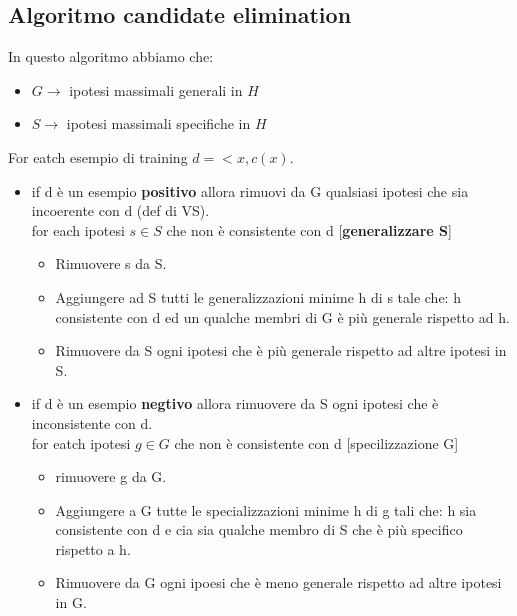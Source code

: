 \subsection{Algoritmo candidate elimination}
In questo algoritmo abbiamo che:
\begin{itemize}
    \item $G \to$ ipotesi massimali generali in $H$
    \item $S \to$ ipotesi massimali specifiche in $H$
\end{itemize}
For eatch esempio di training $d = <x, c(x)$.
\begin{itemize}
    \item if d è un esempio \textbf{positivo} allora rimuovi da G qualsiasi ipotesi che sia incoerente con d (def di VS).\\
    for each ipotesi $s \in S$ che non è consistente con d [\textbf{generalizzare S}]
    \begin{itemize}
        \item Rimuovere s da S.
        \item Aggiungere ad S tutti le generalizzazioni minime h di s tale che: h consistente con d ed un qualche membri di G è più generale rispetto ad h.
        \item Rimuovere da S ogni ipotesi che è più generale rispetto ad altre ipotesi in S.
    \end{itemize}
    \item if d è un esempio \textbf{negtivo} allora rimuovere da S ogni ipotesi che è inconsistente con d.\\
    for eatch ipotesi $g \in G$ che non è consistente con d [specilizzazione G]
    \begin{itemize}
        \item rimuovere g da G.
        \item Aggiungere a G tutte le specializzazioni minime h di g tali che: h sia consistente con d e cia sia qualche membro di S che è più specifico rispetto a h.
        \item Rimuovere da G ogni ipoesi che è meno generale rispetto ad altre ipotesi in G.
    \end{itemize}
\end{itemize}
